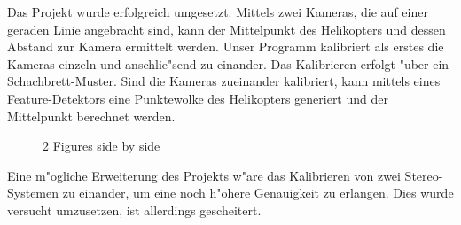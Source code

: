 \noindent Das Projekt wurde erfolgreich umgesetzt.
Mittels zwei Kameras, die auf einer geraden Linie angebracht sind, kann der Mittelpunkt des Helikopters und dessen Abstand zur Kamera ermittelt werden.\newline
Unser Programm kalibriert als erstes die Kameras einzeln und anschlie"send zu einander. Das Kalibrieren erfolgt "uber ein Schachbrett-Muster. Sind die Kameras zueinander kalibriert, kann mittels eines Feature-Detektors eine Punktewolke des Helikopters generiert und der Mittelpunkt berechnet werden.

\begin{figure}%
	\centering
	\qquad
	\caption{2 Figures side by side}%
	\label{fig:example}%
\end{figure}
\noindent Eine m"ogliche Erweiterung des Projekts w"are das Kalibrieren von zwei Stereo-Systemen zu einander, um eine noch h"ohere Genauigkeit zu erlangen. Dies wurde versucht umzusetzen, ist allerdings gescheitert.

